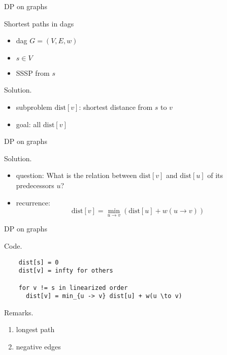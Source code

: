 \begin{frame}{DP on graphs}
  \begin{exampleblock}{Shortest paths in dags}
    \begin{itemize}
      \item dag $G = (V, E, w)$
      \item $s \in V$
      \item SSSP from $s$
    \end{itemize}

  \end{exampleblock}

  \begin{block}{Solution.}
    \begin{itemize}
      \item subproblem $\text{dist}[v]$: shortest distance from $s$ to $v$ 
      \item goal: all $\text{dist}[v]$
    \end{itemize}
  \end{block}
\end{frame}
\begin{frame}{DP on graphs}
  \begin{block}{Solution.}
    \begin{itemize}
      \item question: What is the relation between $\text{dist}[v]$ and $\text{dist}[u]$ of its predecessors $u$?
      \item recurrence:
	\[
	  \text{dist}[v] = \min_{u \to v} \left(\text{dist}[u] + w(u \to v)\right) 
	\]
    \end{itemize}
  \end{block}
\end{frame}
\begin{frame}[fragile]{DP on graphs}
  \begin{block}{Code.}
    \begin{verbatim}
    dist[s] = 0
    dist[v] = infty for others

    for v != s in linearized order
      dist[v] = min_{u -> v} dist[u] + w(u \to v)
    \end{verbatim}
  \end{block}

  \begin{alertblock}{Remarks.}
    \begin{enumerate}
      \item longest path
      \item negative edges
    \end{enumerate}
  \end{alertblock}
\end{frame}
